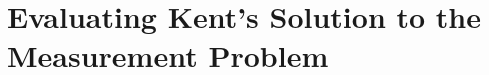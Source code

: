 \chapter{Evaluating Kent's Solution to the Measurement Problem\label{kentchapter}}
\begin{comment}


In the previous chapter, we saw how a denial of the Copenhagen interpretation of quantum mechanics and a denial of hidden variables leads fairly naturally to a so-called many-worlds interpretation of quantum mechanics. However, the many-worlds interpretation seems to be radically opposed to the view that we can make common sense truth claims about the physical world. A strategy among some philosophers of physics who do not wish to endorse the many-worlds interpretation is therefore to reexamine the assumptions that lead to Bell's Inequality. One of these assumptions will have to be discarded since Bell's Inequality is experimentally violated. The false assumption that is used to prove Bell's Inequality is sometimes referred to as \textbf{the culprit}. We therefore need to identify the culprit, that is, we need to decide which assumption we should discard while keeping in mind that we wish to maintain a theory that is compatible with the experimental findings of quantum physics and special relativity.

Shimony noticed that there are two key assumptions in the proof of Bell's Inequality that might be identified as the culprit. He refers to one assumption as {Outcome Independence} (OI), and to the other assumption as {Parameter Independence} (PI).\footnote{See \cite[146-147]{Shimony86}.} Shimony argued that if we only denied OI, then the proof of Bell's Inequality would fail to go through. Yet by continuing to assume PI, there is a sense in which special relativity is not obviously violated. Shimony therefore thought that denying OI and assuming PI was sufficient to ensure peaceful coexistence between quantum theory and special relativity. In other words, Shimony thought OI was the culprit. 

Butterfield,\footnote{See \cite{Butterfield}.} however, argues that although PI is a necessary assumption if there is to be peaceful coexistence between quantum theory and special relativity, PI together with the denial of OI independence is not sufficient to ensure peaceful coexistence. Butterfield thinks this because Shimony fails to offer an account of what an outcome is. As mentioned in the previous chapter,\footnote{See section \ref{probOutcomes}.} the important problem of outcomes was highlighted by d'Espagnat.
It is this omission on Shimony's part that motivates Butterfield to explore whether Kent's interpretation of quantum physics provides what is lacking in Shimony's account. 


\end{comment}

